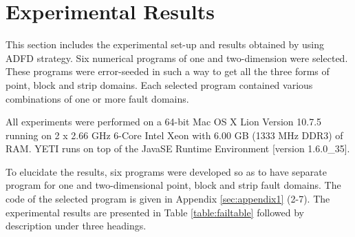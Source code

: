\section{Experimental Results} \label{sec:experimentalResults}
This section includes the experimental set-up and results obtained by using ADFD strategy. Six numerical programs of one and two-dimension were selected. These programs were error-seeded in such a way to get all the three forms of point, block and strip domains. Each selected program contained various combinations of one or more fault domains. 

All experiments were performed on a 64-bit Mac OS X Lion Version 10.7.5 running on 2 x 2.66 GHz 6-Core Intel Xeon with 6.00 GB (1333 MHz DDR3) of RAM. YETI runs on top of the Java\texttrademark  SE Runtime Environment [version 1.6.0\_35]. 

To elucidate the results, six programs were developed so as to have separate program for one and two-dimensional point, block and strip fault domains. The code of the selected program is given in Appendix \ref{sec:appendix1} (2-7). The experimental results are presented in Table \ref{table:failtable} followed by description under three headings.

